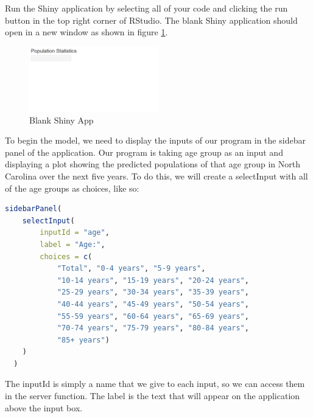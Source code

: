 Run the Shiny application by selecting all of your code and clicking the run button in the top right corner of RStudio.
The blank Shiny application should open in a new window as shown in figure \ref{fig:blank}.
\begin{figure}[h]
   \centering
   \includegraphics[width=0.5\textwidth]{pictures/shiny/blank.PNG} 
   \caption{Blank Shiny App}
   \label{fig:blank}
\end{figure}
To begin the model, we need to display the inputs of our program in the sidebar panel of the application.
Our program is taking age group as an input and displaying a plot showing the predicted populations of that age group in North Carolina over the next five years.
To do this, we will create a selectInput with all of the age groups as choices, like so:
\begin{lstlisting}[language = R]
sidebarPanel(
    selectInput(
        inputId = "age", 
        label = "Age:", 
        choices = c(
            "Total", "0-4 years", "5-9 years", 
            "10-14 years", "15-19 years", "20-24 years", 
            "25-29 years", "30-34 years", "35-39 years", 
            "40-44 years", "45-49 years", "50-54 years", 
            "55-59 years", "60-64 years", "65-69 years", 
            "70-74 years", "75-79 years", "80-84 years", 
            "85+ years")
    )
  )
\end{lstlisting}
The inputId is simply a name that we give to each input, so we can access them in the server function.
The label is the text that will appear on the application above the input box.

